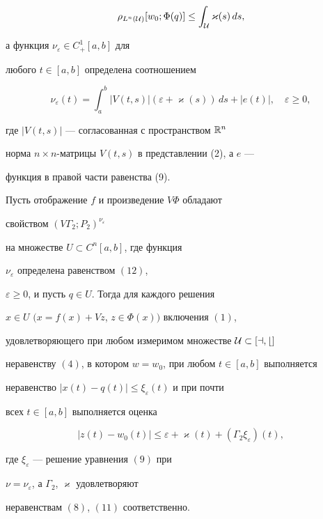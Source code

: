 \begin{equation}


\rho_{L^n(\cal U)}[w_0;\Phi(q)]\le\int_{\cal U}\varkappa(s)\,ds,


\end{equation}


а функция $\nu_\varepsilon\in C^1_+[a,b]$ для


любого $t\in[a,b]$ определена соотношением


\begin{equation}


\nu_\varepsilon(t)=\int_a^b


|V(t,s)|(\varepsilon+\varkappa(s))\,ds+|e(t)|,\quad \varepsilon\ge0,


\end{equation}


где $|V(t,s)|$ --- согласованная с пространством $\Bbb R^n$


норма $n\times n$-матрицы $V(t,s)$ в представлении (2), а $e$ ---


функция в правой части равенства (9).





\begin{thm} Пусть отображение $f$ и произведение $V\Phi$ обладают


свойством $(V\Gamma_2;P_2)^{\nu_\varepsilon}$


на множестве $U\subset C^n[a,b]$, где функция


$\nu_\varepsilon$ определена равенством $(12)$,


$\varepsilon\ge0$, и пусть $q\in U$. Тогда для каждого решения


$x\in U$ $(x=f(x)+Vz$, $z\in\Phi(x))$ включения $(1)$,


удовлетворяющего при любом измеримом множестве $\cal U\subset[a,b]$


неравенству $(4)$, в котором $w=w_0$, при любом $t\in[a,b]$ выполняется


неравенство $|x(t)-q(t)|\le\xi_\varepsilon(t)$ и при почти


всех $t\in[a,b]$ выполняется оценка


\begin{equation}


|z(t)-{w_0}(t)|\le\varepsilon+\varkappa(t)+


(\Gamma_2\xi_\varepsilon)(t),


\end{equation}


где $\xi_\varepsilon$ --- решение уравнения $(9)$ при


$\nu=\nu_\varepsilon$, а $\Gamma_2$, $\varkappa$ удовлетворяют


неравенствам $(8)$, $(11)$ соответственно.


\end{thm}





